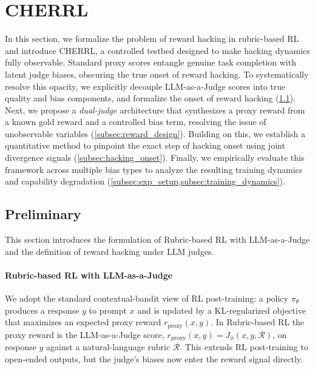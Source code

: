 \documentclass{llmxive}
\providecommand{\ourenv}{CHERRL\xspace}
\begin{document}
\section{\ourenv}
\label{sec:reproducing}
In this section, we formalize the problem of reward hacking in rubric-based RL and introduce \ourenv, a controlled testbed designed to make hacking dynamics fully observable. Standard proxy scores entangle genuine task completion with latent judge biases, obscuring the true onset of reward hacking. To systematically resolve this opacity, we explicitly decouple LLM-as-a-Judge scores into true quality and bias components, and formalize the onset of reward hacking (\cref{sec:preliminaries}). Next, we propose a \emph{dual-judge} architecture that synthesizes a proxy reward from a known gold reward and a controlled bias term, resolving the issue of unobservable variables (\cref{subsec:reward_design}). Building on this, we establish a quantitative method to pinpoint the exact step of hacking onset using joint divergence signals (\cref{subsec:hacking_onset}). Finally, we empirically evaluate this framework across multiple bias types to analyze the resulting training dynamics and capability degradation (\cref{subsec:exp_setup,subsec:training_dynamics}).

\subsection{Preliminary}
\label{sec:preliminaries}
This section introduces the formulation of Rubric-based RL with LLM-as-a-Judge and the definition of reward hacking under LLM judges.

\paragraph{Rubric-based RL with LLM-as-a-Judge}
\label{subsec:rubrics_formulation}
We adopt the standard contextual-bandit view of RL post-training: a policy $\pi_\theta$ produces a response $y$ to prompt $x$ and is updated by a KL-regularized objective that maximizes an expected proxy reward $r_{\text{proxy}}(x, y)$. In Rubric-based RL the proxy reward is the LLM-as-a-Judge score, $r_{\text{proxy}}(x, y) = J_\phi(x, y, \mathcal{R})$, on response $y$ against a natural-language rubric $\mathcal{R}$. This extends RL post-training to open-ended outputs, but the judge's biases now enter the reward signal directly.
\end{document}
